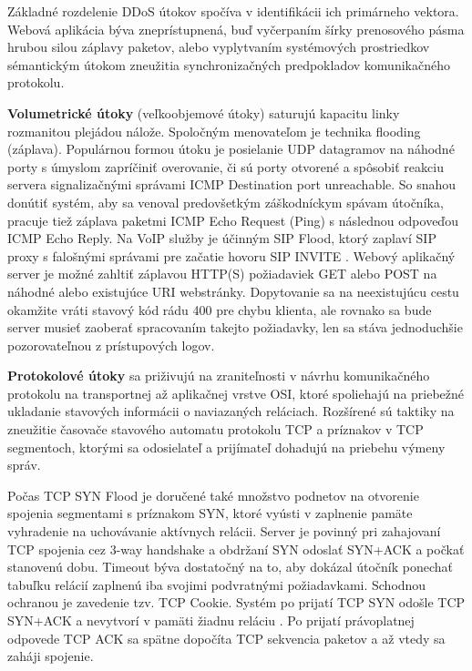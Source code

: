 \documentclass[12pt, a4paper]{article}
\begin{document}
Základné rozdelenie DDoS útokov spočíva v identifikácii ich primárneho vektora. Webová aplikácia
býva zneprístupnená, buď vyčerpaním šírky prenosového pásma hrubou silou záplavy paketov, alebo
vyplytvaním systémových prostriedkov sémantickým útokom zneužitia synchronizačných predpokladov 
komunikačného protokolu.

\textbf{Volumetrické útoky} (veľkoobjemové útoky) saturujú kapacitu linky rozmanitou plejádou nálože. 
Spoločným menovateľom je technika flooding (záplava). Populárnou formou útoku je posielanie UDP datagramov 
na náhodné porty s úmyslom zapríčiniť overovanie, či sú porty otvorené a spôsobiť reakciu 
servera signalizačnými správami ICMP Destination port unreachable. So snahou donútiť systém, aby sa venoval 
predovšetkým záškodníckym spávam útočníka, pracuje tiež záplava paketmi ICMP Echo Request (Ping) 
s následnou odpoveďou ICMP Echo Reply. Na VoIP služby je účinným SIP Flood, ktorý zaplaví SIP proxy s
falošnými správami pre začatie hovoru SIP INVITE \cite{botnets}. Webový aplikačný server je možné zahltiť 
záplavou HTTP(S) požiadaviek GET alebo POST na náhodné alebo existujúce URI webstránky. Dopytovanie sa na 
neexistujúcu cestu okamžite vráti stavový kód rádu 400 pre  chybu klienta, ale rovnako sa bude server 
musieť zaoberať spracovaním takejto požiadavky, len sa stáva jednoduchšie pozorovateľnou z prístupových 
logov. 

\textbf{Protokolové útoky} sa priživujú na zraniteľnosti v návrhu komunikačného protokolu na transportnej
až aplikačnej vrstve OSI, ktoré spoliehajú na priebežné ukladanie stavových informácii o naviazaných
reláciach. Rozšírené sú taktiky na zneužitie časovače stavového automatu protokolu TCP a príznakov v TCP 
segmentoch, ktorými sa odosielateľ a prijímateľ dohadujú na priebehu výmeny správ. 

Počas TCP SYN Flood je doručené také množstvo podnetov na otvorenie spojenia segmentami s príznakom SYN, 
ktoré vyústi v zaplnenie pamäte vyhradenie na uchovávanie aktívnych relácii. Server je povinný pri 
zahajovaní TCP spojenia cez 3-way handshake a obdržaní SYN odoslať SYN+ACK a počkať stanovenú dobu. Timeout 
býva dostatočný na to, aby dokázal útočník ponechať tabuľku relácií zaplnenú iba svojimi podvratnými 
požiadavkami. Schodnou ochranou je zavedenie tzv. TCP Cookie. Systém po prijatí TCP SYN odošle TCP SYN+ACK a 
nevytvorí v pamäti žiadnu reláciu \cite{csirt-ddos}. Po prijatí právoplatnej odpovede TCP ACK sa spätne dopočíta TCP sekvencia paketov a až vtedy sa zaháji spojenie. 
\end{document}
